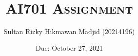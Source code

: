 \documentclass[a4paper,10pt]{article}
\title{AI701 \textsc{Assignment} \assnum}
\author{Sultan Rizky Hikmawan Madjid (20214196)}
\date{Due: October 27, 2021}
\newcommand{\assnum}{2} %
\begin{document}
	\maketitle
	
	\pagebreak
	
	\pagebreak
	
	\pagebreak
	
\end{document}
